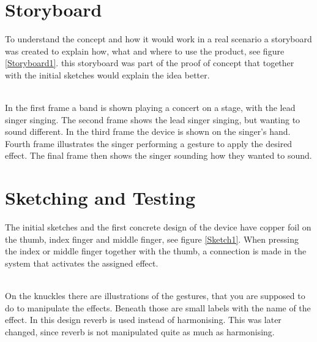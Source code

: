 \section{Storyboard}

To understand the concept and how it would work in a real scenario a storyboard was created to explain how, what and where to use the product, see figure \ref{Storyboard1}. this storyboard was part of the proof of concept that together with the initial sketches would explain the idea better.\\

\begin{minipage}{\linewidth}%
\label{Storyboard1}
\end{minipage}\\

In the first frame a band is shown playing a concert on a stage, with the lead singer singing. The second frame shows the lead singer singing, but wanting to sound different. In the third frame the device is shown on the singer's hand. Fourth frame illustrates the singer performing a gesture to apply the desired effect. The final frame then shows the singer sounding how they wanted to sound.

\section{Sketching and Testing}

The initial sketches and the first concrete design of the device have copper foil on the thumb, index finger and middle finger, see figure \ref{Sketch1}. When pressing the index or middle finger together with the thumb, a connection is made in the system that activates the assigned effect. \\

\begin{minipage}{\linewidth}%
\label{Sketch1}
\end{minipage}\\

On the knuckles there are illustrations of the gestures, that you are supposed to do to manipulate the effects. Beneath those are small labels with the name of the effect. In this design reverb is used instead of harmonising. This was later changed, since reverb is not manipulated quite as much as harmonising.

